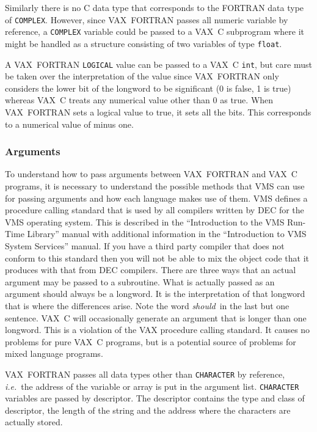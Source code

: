 \documentclass[twoside,11pt,nolof]{starlink}
\begin{document}
Similarly there is no C data type that corresponds to the FORTRAN data type of
\texttt{COMPLEX}\@.
However, since VAX~FORTRAN passes all numeric variable by reference, a
\texttt{COMPLEX} variable could be passed to a VAX~C subprogram where it might
be handled as a structure consisting of two variables of type \texttt{float}.

A VAX~FORTRAN \texttt{LOGICAL} value can be passed to a VAX~C \texttt{int}, but
care must be taken over the interpretation of the value since VAX~FORTRAN only
considers the lower bit of the longword to be significant (0 is false, 1 is
true) whereas VAX~C treats any numerical value other than 0 as true.
When VAX~FORTRAN sets a
logical value to true, it sets all the bits. This corresponds to a numerical
value of minus one.

\subsubsection{\label{vms_arg}Arguments}

To understand how to pass arguments between VAX~FORTRAN and VAX~C programs, it
is necessary to understand the possible methods that VMS can use for passing
arguments and how each language makes use of them. VMS defines a procedure
calling standard that is used by all compilers written by DEC for the VMS
operating system. This is described in the ``Introduction to the VMS Run-Time
Library'' manual with additional information in the ``Introduction to VMS System
Services'' manual. If you have a third party compiler that does not conform to
this standard then you will not be able to mix the object code that it produces
with that from DEC compilers. There are three ways that an actual argument may
be passed to a subroutine. What is actually passed as an argument should always
be a longword. It is the interpretation of that longword that is where the
differences arise. Note the word \textit{should}\, in the last but one sentence.
VAX~C will occasionally generate an argument that is longer than one longword.
This is a violation of the VAX procedure calling standard. It causes no
problems for pure VAX~C programs, but is a potential source of problems for
mixed language programs.

VAX~FORTRAN passes all data types other than \texttt{CHARACTER} by reference,
\textit{i.e.}\ the address of the variable or array is put in the argument list.
\texttt{CHARACTER} variables are passed by descriptor.
The descriptor contains the type and class of descriptor, the length of the
string and the address where the characters are actually stored.
\end{document}
